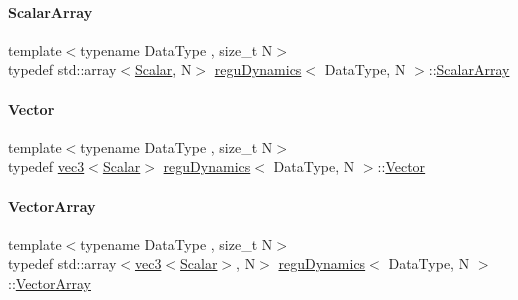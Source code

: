 \mbox{\label{classregu_dynamics_a34b4b77ea3e49e1cdef584ec8bd281dc}} 
\paragraph{\texorpdfstring{Scalar\+Array}{ScalarArray}}
{\footnotesize\ttfamily template$<$typename Data\+Type , size\+\_\+t N$>$ \\
typedef std\+::array$<$\mbox{\hyperlink{classregu_dynamics_a359c55370b4dee032396f0df86ad5fab}{Scalar}}, N$>$ \mbox{\hyperlink{classregu_dynamics}{regu\+Dynamics}}$<$ Data\+Type, N $>$\+::\mbox{\hyperlink{classregu_dynamics_a34b4b77ea3e49e1cdef584ec8bd281dc}{Scalar\+Array}}}

\mbox{\label{classregu_dynamics_a454c165b5e838c6b44a3f18d6722a9e2}} 
\paragraph{\texorpdfstring{Vector}{Vector}}
{\footnotesize\ttfamily template$<$typename Data\+Type , size\+\_\+t N$>$ \\
typedef \mbox{\hyperlink{structvec3}{vec3}}$<$\mbox{\hyperlink{classregu_dynamics_a359c55370b4dee032396f0df86ad5fab}{Scalar}}$>$ \mbox{\hyperlink{classregu_dynamics}{regu\+Dynamics}}$<$ Data\+Type, N $>$\+::\mbox{\hyperlink{classregu_dynamics_a454c165b5e838c6b44a3f18d6722a9e2}{Vector}}}

\mbox{\label{classregu_dynamics_a86a05253d927e1716f3401e887aa5c8e}} 
\paragraph{\texorpdfstring{Vector\+Array}{VectorArray}}
{\footnotesize\ttfamily template$<$typename Data\+Type , size\+\_\+t N$>$ \\
typedef std\+::array$<$\mbox{\hyperlink{structvec3}{vec3}}$<$\mbox{\hyperlink{classregu_dynamics_a359c55370b4dee032396f0df86ad5fab}{Scalar}}$>$, N$>$ \mbox{\hyperlink{classregu_dynamics}{regu\+Dynamics}}$<$ Data\+Type, N $>$\+::\mbox{\hyperlink{classregu_dynamics_a86a05253d927e1716f3401e887aa5c8e}{Vector\+Array}}}




